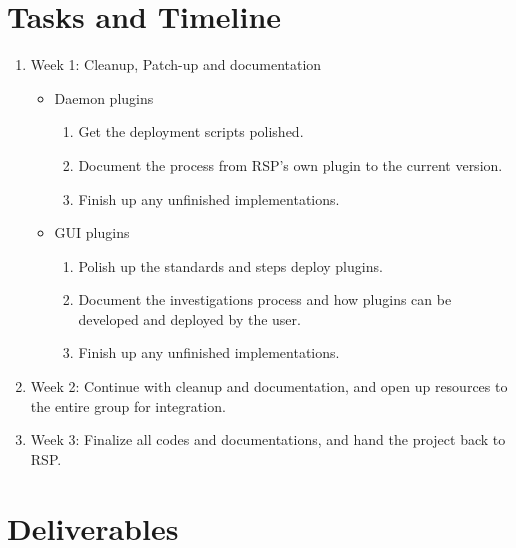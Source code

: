 \documentclass{article}
\begin{document}
\section*{Tasks and Timeline}

\begin{enumerate}
    \item Week 1: Cleanup, Patch-up and documentation
        \begin{itemize}
            \item Daemon plugins
                \begin{enumerate}
                    \item Get the deployment scripts polished. 
                    \item Document the process from RSP's own plugin to the current version. 
                    \item Finish up any unfinished implementations.
                \end{enumerate}
            \item GUI plugins
                \begin{enumerate}
                    \item Polish up the standards and steps deploy plugins. 
                    \item Document the investigations process and how plugins can be developed and deployed by the user. 
                    \item Finish up any unfinished implementations. 
                \end{enumerate}
        \end{itemize}
    \item Week 2: Continue with cleanup and documentation, and open up resources to the entire group for integration. 
    \item Week 3: Finalize all codes and documentations, and hand the project back to RSP.
\end{enumerate}

\section*{Deliverables}
\end{document}
